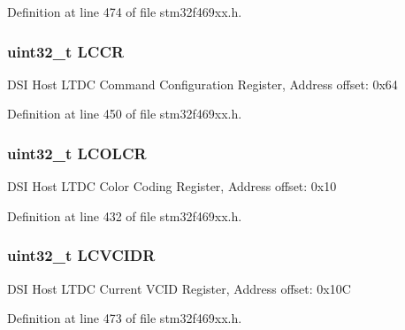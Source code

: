 Definition at line 474 of file stm32f469xx.\+h.

\subsubsection[{\texorpdfstring{L\+C\+CR}{LCCR}}]{ uint32\+\_\+t L\+C\+CR}\hypertarget{struct_d_s_i___type_def_a45337ccbf651d195c2c113b91c0abb30}{}\label{struct_d_s_i___type_def_a45337ccbf651d195c2c113b91c0abb30}
D\+SI Host L\+T\+DC Command Configuration Register, Address offset\+: 0x64 

Definition at line 450 of file stm32f469xx.\+h.

\subsubsection[{\texorpdfstring{L\+C\+O\+L\+CR}{LCOLCR}}]{ uint32\+\_\+t L\+C\+O\+L\+CR}\hypertarget{struct_d_s_i___type_def_adec8c4fe22023eb8df6fb9069b9204a5}{}\label{struct_d_s_i___type_def_adec8c4fe22023eb8df6fb9069b9204a5}
D\+SI Host L\+T\+DC Color Coding Register, Address offset\+: 0x10 

Definition at line 432 of file stm32f469xx.\+h.

\subsubsection[{\texorpdfstring{L\+C\+V\+C\+I\+DR}{LCVCIDR}}]{ uint32\+\_\+t L\+C\+V\+C\+I\+DR}\hypertarget{struct_d_s_i___type_def_ade4f4e7fc1c188af585a23889a95aeff}{}\label{struct_d_s_i___type_def_ade4f4e7fc1c188af585a23889a95aeff}
D\+SI Host L\+T\+DC Current V\+C\+ID Register, Address offset\+: 0x10C 

Definition at line 473 of file stm32f469xx.\+h.

